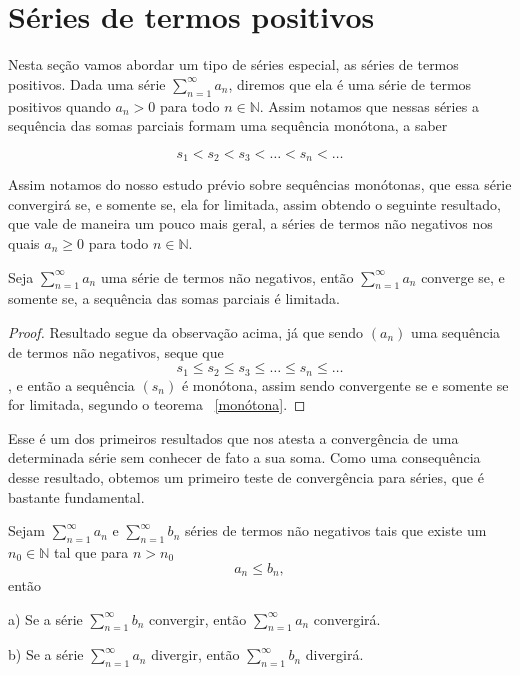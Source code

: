 \section{Séries de termos positivos}
\construirSec

Nesta seção vamos abordar um tipo de séries especial, as séries de termos 
positivos. Dada uma série $\sum_{n = 1}^{\infty} a_n$, diremos que ela é uma
série de termos positivos quando $a_n > 0$ para todo $n \in \mathbb{N}$. Assim
notamos que nessas séries a sequência das somas parciais formam uma sequência
monótona, a saber

$$ s_1 < s_2 < s_3 < \dots < s_n < \dots$$

Assim notamos do nosso estudo prévio sobre sequências monótonas, que essa série
convergirá se, e somente se, ela for limitada, assim obtendo o seguinte resultado,
que vale de maneira um pouco mais geral, a séries de termos não negativos nos
quais $a_n \geq 0$ para todo $n \in \mathbb{N}$.

\begin{teo}\label{séries termos positivos}
    Seja $\sum_{n = 1}^{\infty} a_n$ uma série de termos não negativos, então 
    $\sum_{n = 1}^{\infty} a_n$ converge se, e somente se, a sequência das somas
    parciais é limitada.
\end{teo}

\begin{proof}
    Resultado segue da observação acima, já que sendo $(a_n)$ uma sequência de
    termos não negativos, seque que 
    $$ s_1 \leq s_2 \leq s_3 \leq \dots \leq s_n \leq \dots$$,
    e então a sequência $(s_n)$ é monótona, assim sendo convergente se e somente
    se for limitada, segundo o teorema ~\ref{monótona}.
\end{proof}

Esse é um dos primeiros resultados que nos atesta a convergência de uma 
determinada série sem conhecer de fato a sua soma. Como uma consequência desse
resultado, obtemos um primeiro teste de convergência para séries, que é bastante
fundamental.

\begin{teo}\label{comparação}
    Sejam $\sum_{n = 1}^{\infty} a_n$ e $\sum_{n = 1}^{\infty} b_n$ séries de
    termos não negativos tais que existe um $n_0 \in \mathbb{N}$ tal que para
    $n>n_0$
    $$a_n \leq b_n,$$
    então
    \item [a)] Se a série $\sum_{n = 1}^{\infty} b_n$ convergir, então
    $\sum_{n = 1}^{\infty} a_n$ convergirá.
    \item [b)] Se a série $\sum_{n = 1}^{\infty} a_n$ divergir,
    então $\sum_{n = 1}^{\infty} b_n$ divergirá.
\end{teo}

